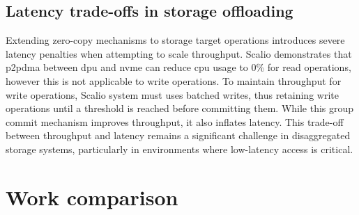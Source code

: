 \subsection{Latency trade-offs in storage offloading}

Extending zero-copy mechanisms to storage target operations introduces severe latency penalties when attempting to scale throughput. Scalio demonstrates that \acrlong{p2pdma} between \acrshort{dpu} and \acrshort{nvme} can reduce \acrshort{cpu} usage to 0\% for read operations, however this is not applicable to write operations. To maintain throughput for write operations, Scalio system must uses batched writes, thus retaining write operations until a threshold is reached before committing them. While this group commit mechanism improves throughput, it also inflates latency. This trade-off between throughput and latency remains a significant challenge in disaggregated storage systems, particularly in environments where low-latency access is critical.

\section{Work comparison}

